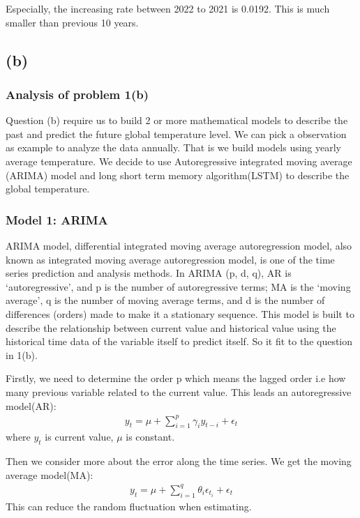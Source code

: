 \documentclass{apmcmthesis}
\begin{document}
Especially, the increasing rate between 2022 to 2021 is 0.0192.
This is much smaller than previous 10 years.


\subsection{(b)}
\subsubsection{Analysis of problem 1(b)}
Question (b) require us to build 2 or more mathematical models to describe the past and predict the future global temperature level.
We can pick a observation as example to analyze the data annually. 
That is we build models using yearly average temperature. 
We decide to use Autoregressive integrated moving average (ARIMA) model and long short term memory algorithm(LSTM) to describe the global temperature.

\subsubsection{Model 1: ARIMA}

ARIMA model, differential integrated moving average autoregression model, also known as integrated moving average autoregression model, 
is one of the time series prediction and analysis methods.
In ARIMA (p, d, q), AR is `autoregressive', and p is the number of autoregressive terms; 
MA is the `moving average', q is the number of moving average terms, and d is the number of differences (orders) made to make it a stationary sequence.
This model is built to describe the relationship between current value and historical value using the historical time data of the variable itself to predict itself.
So it fit to the question in 1(b).

Firstly, we need to determine the order p which means the lagged order i.e how many previous variable related to the current value.
This leads an autoregressive model(AR):
\begin{align*}
  y_t = \mu + \sum^p_{i=1} \gamma_i y_{t-i} + \epsilon_t
\end{align*}
where $y_t$ is current value, $\mu$ is constant.

Then we consider more about the error along the time series. 
We get the moving average model(MA):
\begin{align*}
  y_t = \mu + \sum^q_{i=1} \theta_i \epsilon_{t_i} + \epsilon_t
\end{align*}
This can reduce the random fluctuation when estimating. 
\end{document}
